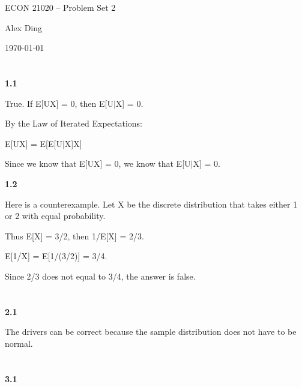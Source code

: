 



{\LARGE \centering ECON 21020 -- Problem Set 2\par}
{\vspace{-1em} \large \centering Alex Ding \par}
{\centering \vspace{-1em} \today \par }

\section{}
\textbf{1.1}

True. If E[UX] = 0, then E[U$\mid$X] = 0.

By the Law of Iterated Expectations:

E[UX] = E[E[U$\mid$X]X]

Since we know that E[UX] = 0, we know that E[U$\mid$X] = 0.

\textbf{1.2}

Here is a counterexample.
Let X be the discrete distribution that takes either 1 or 2 with equal probability.

Thus E[X] = 3/2, then 1/E[X] = 2/3.

E[1/X] = E[1/(3/2)] = 3/4.

Since 2/3 does not equal to 3/4, the answer is false.


\section{}

\textbf{2.1}

The drivers can be correct because the sample distribution does not have to be normal.

\section{}

\textbf{3.1}

\section{}

